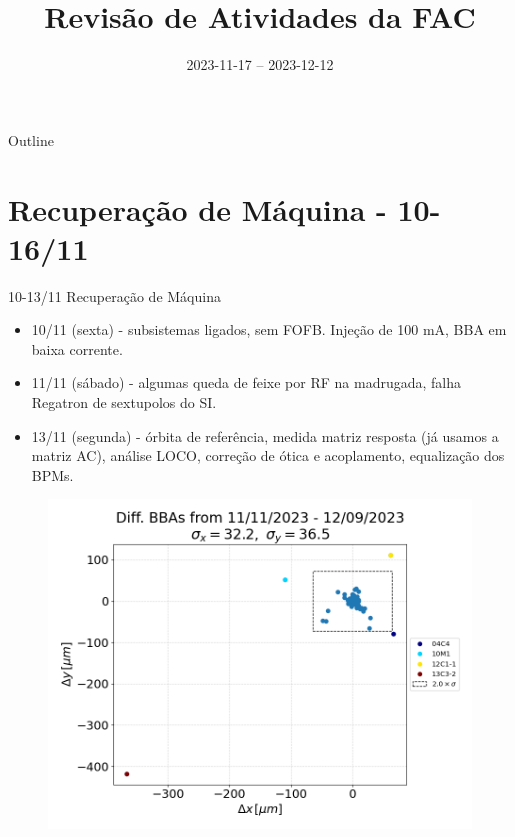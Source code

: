 \documentclass{beamer}					  %
\title{Revisão de Atividades da FAC}	%
\institute{LNLS.DAC.FAC}				%
\date{2023-11-17 -- 2023-12-12}			%
\begin{document}
\begin{frame}
  \titlepage
  \href{https://github.com/lnls-fac/doc-review-dac-fac}{}
  \href{https://www.overleaf.com/read/sbdjxtzfchrm}{}
\end{frame}

\begin{frame}{Outline}
  \tableofcontents
\end{frame}


\section{Recuperação de Máquina - 10-16/11}

\begin{frame}{10-13/11 Recuperação de Máquina}
    \begin{minipage}{0.4\textwidth}
        \scriptsize{
        \begin{itemize}
    		\item 10/11 (sexta) - subsistemas ligados, sem FOFB. Injeção de 100 mA, BBA em baixa corrente.
            \item 11/11 (sábado) - algumas queda de feixe por RF na madrugada, falha Regatron de sextupolos do SI.
            \item 13/11 (segunda) - órbita de referência, medida matriz resposta (já usamos a matriz AC), análise LOCO, correção de ótica e acoplamento, equalização dos BPMs.
        \end{itemize}}
    \end{minipage}
    \begin{minipage}{0.58\textwidth}
        \captionsetup[figure]{font=tiny}
        \begin{figure}[H]
        	\centering
            \includegraphics[width=1\textwidth]{2023-11-17/figures/diff_to_bba_after_september23_shutdown.png}

\end{figure}
\end{minipage}
\end{frame}
\end{document}
